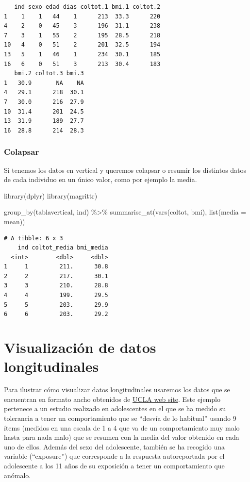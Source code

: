 \documentclass[
]{book}
\newenvironment{Shaded}{\begin{snugshade}}{\end{snugshade}}
\newcommand{\AttributeTok}[1]{\textcolor[rgb]{0.77,0.63,0.00}{#1}}
\newcommand{\FunctionTok}[1]{\textcolor[rgb]{0.00,0.00,0.00}{#1}}
\newcommand{\NormalTok}[1]{#1}
\newcommand{\SpecialCharTok}[1]{\textcolor[rgb]{0.00,0.00,0.00}{#1}}
\begin{document}
\begin{verbatim}
   ind sexo edad dias coltot.1 bmi.1 coltot.2
1    1    1   44    1      213  33.3      220
4    2    0   45    3      196  31.1      238
7    3    1   55    2      195  28.5      218
10   4    0   51    2      201  32.5      194
13   5    1   46    1      234  30.1      185
16   6    0   51    3      213  30.4      183
   bmi.2 coltot.3 bmi.3
1   30.9       NA    NA
4   29.1      218  30.1
7   30.0      216  27.9
10  31.4      201  24.5
13  31.9      189  27.7
16  28.8      214  28.3
\end{verbatim}

\hypertarget{colapsar}{%
\subsection{Colapsar}\label{colapsar}}

Si tenemos los datos en vertical y queremos colapsar o resumir los distintos datos de cada individuo en un único valor, como por ejemplo la media.

\begin{Shaded}
\begin{Highlighting}[]
\FunctionTok{library}\NormalTok{(dplyr) }
\FunctionTok{library}\NormalTok{(magrittr)}

\FunctionTok{group\_by}\NormalTok{(tablavertical, ind) }\SpecialCharTok{\%\textgreater{}\%}
  \FunctionTok{summarise\_at}\NormalTok{(}\FunctionTok{vars}\NormalTok{(coltot, bmi), }\FunctionTok{list}\NormalTok{(}\AttributeTok{media =}\NormalTok{ mean))}
\end{Highlighting}
\end{Shaded}

\begin{verbatim}
# A tibble: 6 x 3
    ind coltot_media bmi_media
  <int>        <dbl>     <dbl>
1     1         211.      30.8
2     2         217.      30.1
3     3         210.      28.8
4     4         199.      29.5
5     5         203.      29.9
6     6         203.      29.2
\end{verbatim}

\hypertarget{visualizaciuxf3n-de-datos-longitudinales}{%
\chapter{Visualización de datos longitudinales}\label{visualizaciuxf3n-de-datos-longitudinales}}

Para ilustrar cómo visualizar datos longitudinales usaremos los datos que se encuentran en formato ancho obtenidos de \href{https://stats.idre.ucla.edu/r/examples/alda/r-applied-longitudinal-data-analysis-ch-2/}{UCLA web site}. Este ejemplo pertenece a un estudio realizado en adolescentes en el que se ha medido su tolerancia a tener un comportamiento que se ``desvía de lo habitual'' usando 9 ítems (medidos en una escala de 1 a 4 que va de un comportamiento muy malo hasta para nada malo) que se resumen con la media del valor obtenido en cada uno de ellos. Además del sexo del adolescente, también se ha recogido una variable (``exposure'') que corresponde a la respuesta autoreportada por el adolescente a los 11 años de su exposición a tener un comportamiento que anómalo.
\end{document}
